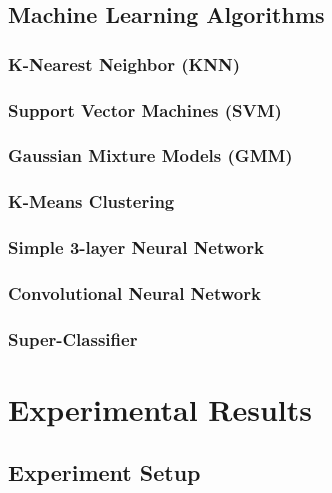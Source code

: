 


\subsection{Machine Learning Algorithms}
\subsubsection{K-Nearest Neighbor (KNN)}

\subsubsection{Support Vector Machines (SVM)}

\subsubsection{Gaussian Mixture Models (GMM)}

\subsubsection{K-Means Clustering}

\subsubsection{Simple 3-layer Neural Network}

\subsubsection{Convolutional Neural Network}

\subsubsection{Super-Classifier}

\section{Experimental Results}\label{sec:results}

\subsection{Experiment Setup}

